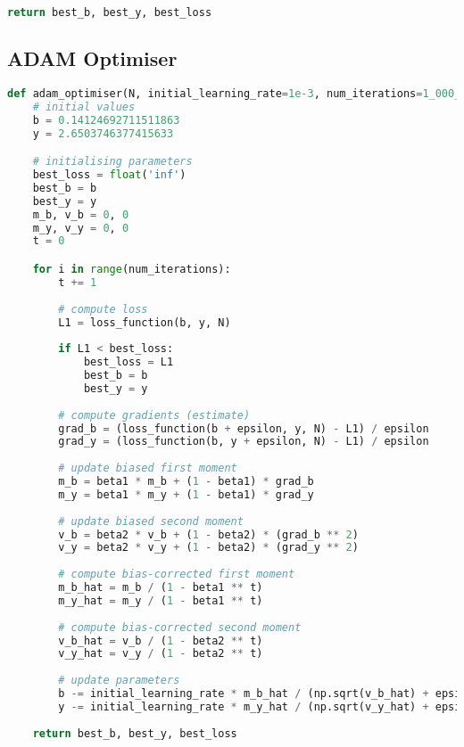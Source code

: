 \begin{appendices}
\begin{lstlisting}[language=Python, caption= null]
    return best_b, best_y, best_loss
\end{lstlisting}

\subsection{ADAM Optimiser}
\begin{lstlisting}[language=Python, caption= null]
def adam_optimiser(N, initial_learning_rate=1e-3, num_iterations=1_000_000, beta1=0.9, beta2=0.999, epsilon=1e-5):
	# initial values
    b = 0.14124692711511863
    y = 2.6503746377415633

	# initialising parameters
    best_loss = float('inf')
    best_b = b
    best_y = y
    m_b, v_b = 0, 0
    m_y, v_y = 0, 0
    t = 0

    for i in range(num_iterations):
        t += 1
        
        # compute loss
        L1 = loss_function(b, y, N)
        
        if L1 < best_loss:
            best_loss = L1
            best_b = b
            best_y = y
        
        # compute gradients (estimate)
        grad_b = (loss_function(b + epsilon, y, N) - L1) / epsilon
        grad_y = (loss_function(b, y + epsilon, N) - L1) / epsilon
        
        # update biased first moment
        m_b = beta1 * m_b + (1 - beta1) * grad_b
        m_y = beta1 * m_y + (1 - beta1) * grad_y
        
        # update biased second moment
        v_b = beta2 * v_b + (1 - beta2) * (grad_b ** 2)
        v_y = beta2 * v_y + (1 - beta2) * (grad_y ** 2)
        
        # compute bias-corrected first moment
        m_b_hat = m_b / (1 - beta1 ** t)
        m_y_hat = m_y / (1 - beta1 ** t)
        
        # compute bias-corrected second moment
        v_b_hat = v_b / (1 - beta2 ** t)
        v_y_hat = v_y / (1 - beta2 ** t)
        
        # update parameters
        b -= initial_learning_rate * m_b_hat / (np.sqrt(v_b_hat) + epsilon)
        y -= initial_learning_rate * m_y_hat / (np.sqrt(v_y_hat) + epsilon)
       
    return best_b, best_y, best_loss
\end{lstlisting}

  
\end{appendices}